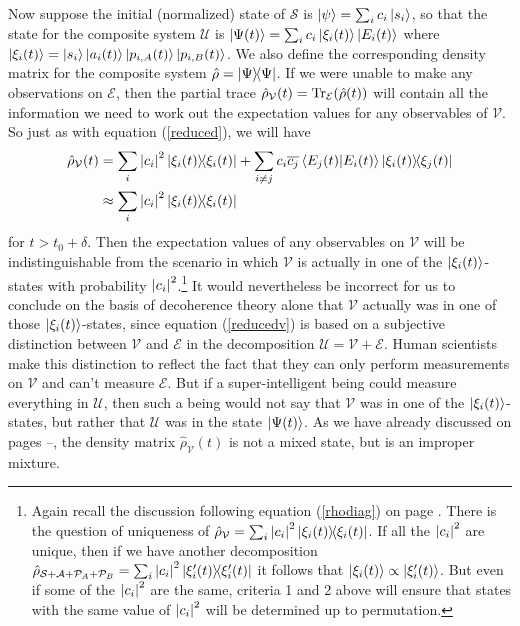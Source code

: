     Now suppose the initial (normalized) state of $\mathcal{S}$ is $\ket{\psi}=\sum_i c_i\ket{s_i}$, so that the state for the composite system $\mathcal{U}$ is $\ket{\Psi(t)}=\sum_i c_i \ket{\xi_i(t)}\ket{E_i(t)}$ where $\ket{\xi_i(t)}=\ket{s_i}\ket{a_i(t)}\ket{p_{i,A}(t)}\ket{p_{i,B}(t)}$. We also define the corresponding density matrix for the composite system $\hat{\rho}=\dyad{\Psi}$. If we were unable to make any observations on $\mathcal{E}$, then 
     the partial trace
    $\hat{\rho}_{\mathcal{V}}(t)=\operatorname{Tr}_\mathcal{E}(\hat{\rho}(t))$ will contain all the information we need to work out the expectation values for any observables of  $\mathcal{V}.$ So just as with equation (\ref{reduced}), we will have
    \begin{equation} \label{reducedv}
    \begin{split}
      \hat{\rho}_{\mathcal{V}}(t)&=\sum_{i}\abs{c_i}^2\dyad{\xi_i(t)}+\sum_{i\neq j}c_i\overline{c_j}\ip{E_j(t)}{E_i(t)}\dyad{\xi_i(t)}{\xi_j(t)}\\
      &\approx \sum_{i}\abs{c_i}^2\dyad{\xi_i(t)}
      \end{split}\end{equation}
      for $t>t_0+\delta.$ Then the expectation values of any observables on $\mathcal{V}$ will be indistinguishable from the scenario in which $\mathcal{V}$ is actually in one of the $\ket{\xi_i(t)}$-states with probability $\abs{c_i}^2$.\footnote{Again recall the discussion following equation (\ref{rhodiag}) on page \pageref{rhodiag}. There is the question of uniqueness of $\hat{\rho}_{\mathcal{V}}=\sum_{i}\abs{c_i}^2\dyad{\xi_i(t)}$. If all the $\abs{c_i}^2$ are unique, then if we have another decomposition $\hat{\rho}_{\mathcal{S}+\mathcal{A}+\mathcal{P}_A+\mathcal{P}_B}=\sum_{i}\abs{c_i}^2\dyad{\xi_i'(t)}$ it follows that $\ket{\xi_i(t)}\propto\ket{\xi_i'(t)}$. But even if some of the $\abs{c_i}^2$ are the same, criteria 1 and 2 above will ensure that states with the same  value of $\abs{c_i}^2$ will be determined up to permutation.} It would nevertheless be incorrect for us to conclude on the basis of decoherence theory alone that $\mathcal{V}$ actually was in one of those $\ket{\xi_i(t)}$-states, since equation (\ref{reducedv}) is based on a subjective distinction between $\mathcal{V}$ and $\mathcal{E}$ in the decomposition $\mathcal{U}=\mathcal{V}+\mathcal{E}.$ Human scientists make this distinction to reflect the fact that they can only perform measurements on $\mathcal{V}$ and can't measure $\mathcal{E}$. But if a super-intelligent being could measure everything in  $\mathcal{U}$, then such a being would not say that $\mathcal{V}$ was in one of the  $\ket{\xi_i(t)}$-states, but rather that $\mathcal{U}$ was in the state $\ket{\Psi(t)}$. As we have already discussed on pages \pageref{subtle}--\pageref{subtleend}, the density matrix $ \hat{\rho}_{\mathcal{V}}(t)$ is not a mixed state, but is an improper mixture. 
    
